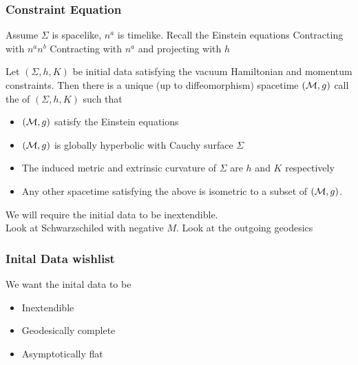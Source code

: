 \documentclass{article}
\begin{document}
\begin{prop}
\end{prop}

\begin{lemma}
\end{lemma}

\subsubsection*{Constraint Equation}
Assume $\Sigma$ is spacelike, $n^a$ is timelike. Recall the Einstein equations 
Contracting with $n^a n^b$
Contracting with $n^a$ and projecting with $h$ 

\begin{theorem}
Let $(\Sigma, h,K)$ be initial data satisfying the vacuum Hamiltonian and momentum constraints. Then there is a unique (up to diffeomorphism) spacetime $(\mathcal{M},g)$ call the  of  $(\Sigma, h,K)$ such that 
\begin{itemize}
    \item $(\mathcal{M},g)$ satisfy the Einstein equations 
    \item $(\mathcal{M},g)$ is globally hyperbolic with Cauchy surface $\Sigma$ 
    \item The induced metric and extrinsic curvature of $\Sigma$ are $h$ and $K$ respectively 
    \item Any other spacetime satisfying the above is isometric to a subset of $(\mathcal{M},g)$. 
\end{itemize}
\end{theorem}
We will require the initial data to be inextendible. 
\\
Look at Schwarzschiled with negative $M$. 
Look at the outgoing geodesics 

\subsubsection*{Inital Data wishlist}
We want the inital data to be 
\begin{itemize}
    \item Inextendible 
    \item Geodesically complete
    \item Asymptotically flat
\end{itemize}
\end{document}
